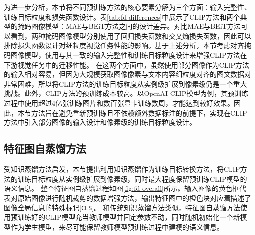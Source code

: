 为进一步分析，本节将不同预训练方法的核心要素分解为三个方面：输入完整性、训练目标粒度和损失函数设计。表\ref{tab:fd-differences}中展示了CLIP方法和两个典型的掩码图像模型：MAE与BEiT\cite{bao2021beit}方法之间的设计差异。对比MAE与BEiT方法可以看到，两种掩码图像模型分别使用了回归损失函数和交叉熵损失函数，因此可以排除损失函数设计对细粒度视觉任务性能的影响。基于上述分析，本节考虑对齐掩码图像模型，使用与其一致的输入完整性和训练目标粒度设计来增强CLIP方法在下游视觉任务中的迁移性能。
在这两个方面中，虽然使用部分图像作为CLIP方法的输入相对容易\cite{FLIP}，但因为大规模获取图像像素与文本内容细粒度对齐的图文数据对非常困难，所以将CLIP方法的训练目标粒度从实例级扩展到像素级仍是一个重大挑战。此外，CLIP方法的预训练成本较高。以OpenAI CLIP模型为例，其预训练过程中使用超过4亿张训练图片和数百张显卡训练数周，才能达到较好效果。因此，本节方法旨在避免重新预训练且不依赖额外数据标注的前提下，实现在CLIP方法中引入部分图像的输入设计和像素级的训练目标粒度设计。

\subsection{特征图自蒸馏方法}



受知识蒸馏方法启发，本节提出利用知识蒸馏作为训练目标转换方法，将CLIP方法的训练目标粒度从实例级扩展到像素级，同时最大程度保留预训练CLIP模型的语义信息。
整个特征图自蒸馏过程如图\ref{fig:fd-overall}所示。输入图像的黄色框代表对原始图像进行随机裁剪的数据增强方法，输出特征图中的橙色块对应着描述了图像全局信息的特殊标记[\texttt{CLS}]。
和传统知识蒸馏方法类似，特征图自蒸馏方法使用预训练好的CLIP模型充当教师模型并固定参数不动，同时随机初始化一个新模型作为学生模型，来尽可能保留教师模型预训练过程中建模的语义信息。%

